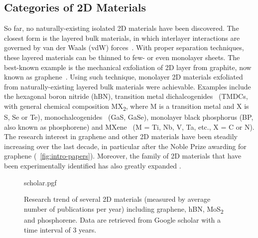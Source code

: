 

\subsection{Categories of 2D Materials}
\label{sec:categ-2d-mater}

So far, no naturally-existing isolated 2D
materials have been discovered.
%
The closest form is the layered bulk materials, in which interlayer
interactions are governed by van der Waals (vdW)
forces~.
%
With proper separation techniques, these layered materials can be
thinned to few- or even mono\-layer sheets.
%
The best-known example is the mechanical exfoliation of 2D layer from graphite,
now known as graphene~\cite{Novoselov_2004_gr}.
%
Using such technique, mono\-layer 2D materials exfoliated from naturally-existing
layered bulk materials were achievable.
%
Examples include the hexagonal boron
nitride\cite{Cavar_2008_hBN_Pt,Gorbachev_2011} (hBN), transition metal
dichalcogenides~\cite{Mak_2010_mos2} (TMDCs, with general chemical
composition MX\textsubscript{2}, where M is a transition metal and X
is S, Se or Te), monochalcogenides~\cite{Late_2012_GaS} (GaS, GaSe),
monolayer black phosphorus\cite{Li_2014_BP} (BP, also known as
phosphorene) and MXene~\cite{Naguib_2011_Mxene} (M = Ti, Nb, V, Ta,
etc., X = C or N).
%
The research interest in graphene and other 2D materials have been
steadily increasing over the last decade, in particular after the
Noble Prize awarding for graphene (~\autoref{fig:intro-papers}).
%
Moreover, the family of 2D materials that have been experimentally
identified has also greatly expanded
\cite{Bhimanapati_2015_2D_rev,Mannix_2017}.

\begin{figure}[htbp]
  \centering
  {scholar.pgf}
  \caption{\label{fig:intro-papers} %
    Research trend of several 2D materials (measured by average number
    of publications per year) including graphene, hBN,
    MoS\textsubscript{2} and phosphorene. Data are retrieved from
    Google scholar with a time interval of 3 years.  }
\end{figure}

